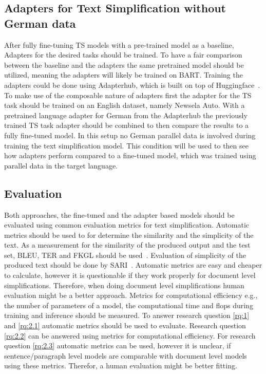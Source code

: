 \subsection{Adapters for Text Simplification without German data}
After fully fine-tuning TS models with a pre-trained model as a baseline,
Adapters for the desired tasks should be trained.
To have a fair comparison between the baseline and the adapters the same pretrained model
should be utilized, meaning the adapters will likely be trained on BART.
Training the adapters could be done using Adapterhub, which is built on top of Huggingface~\cite{Pfeiffer2023}.
To make use of the composable nature of adapters first the adapter for the TS task should be trained
on an English dataset, namely Newsela Auto.
With a pretrained language adapter for German from the Adapterhub the previously trained TS task adapter should be combined
to then compare the results to a fully fine-tuned model.
In this setup no German parallel data is involved during training the text simplification model. This condition will be used to then see how
adapters perform compared to a fine-tuned model, which was trained using parallel data in the target language.


\subsection{Evaluation}
Both approaches, the fine-tuned and the adapter based models should be evaluated
using common evaluation metrics for text simplification.
Automatic metrics should be used to for determine the similarity and the simplicity of the text.
As a measurement for the similarity of the produced output and the test set, BLEU, TER and FKGL should be used~\cite{AlvaManchego2020}.
Evaluation of simplicity of the produced text should be done by SARI~\cite{AlvaManchego2020}.
Automatic metrics are easy and cheaper to calculate, however it is questionable if they work properly for document level
simplifications. Therefore, when doing document level simplifications human evaluation might be a better approach.
Metrics for computational efficiency e.g., the number of parameters of a model, the computational time and flops during
training and inference should be measured.
To answer research question \ref{rq:1} and \ref{rq:2.1} automatic metrics should be used to evaluate. Research question \ref{rq:2.2} can be answered
using metrics for computational efficiency. For research question \ref{rq:2.3} automatic metrics can be used, however it is unclear, if 
sentence/paragraph level models are comparable with document level models using these metrics. Therefor, a human evaluation might be better fitting.